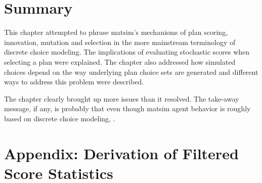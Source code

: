 \section{\label{sec:Summary}Summary}
This chapter attempted to phrase \gls{matsim}'s mechanisms of plan scoring,
innovation, mutation and selection in the more mainstream
terminology of discrete choice modeling. The implications of evaluating
stochastic scores when selecting a plan were explained. 
The chapter also addressed how simulated choices depend on the way
 underlying plan choice sets are generated\corr{}{,} and different
ways to address this problem were described.


The chapter clearly brought up more issues than it resolved. The take-away message,
if any, is probably that even though \gls{matsim} agent behavior is roughly based
on discrete choice modeling, . 


\section*{Appendix: Derivation of Filtered Score Statistics}

